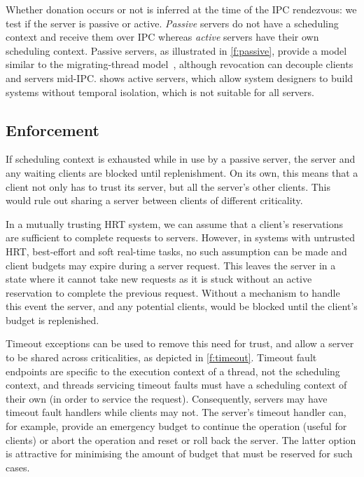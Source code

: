 Whether donation occurs or not is inferred at the time of the \gls{IPC} rendezvous: we test if the
server is passive or active. 
\emph{Passive} servers do not have a scheduling context 
and receive them over \gls{IPC} whereas \emph{active} servers have their own scheduling context. 
Passive servers, as illustrated in \cref{f:passive}, provide a model similar to the 
 migrating-thread model~\citep{Ford_Lepreau_94, Gabber_SBBS_99}, although revocation can decouple
 clients and servers mid-IPC.  shows active servers, which allow system designers to
build systems without temporal isolation, which is not suitable
for all servers.

\subsection{Enforcement}

If scheduling context is exhausted while in use by a passive server, the server and any waiting clients
are blocked until replenishment. On its own, this means that a client
not only has to trust its server, but all the server's other
clients. This would rule out sharing a server between clients of
different criticality.

In a mutually trusting \gls{HRT} system, we can assume that a client's reservations are sufficient to complete
requests to servers.  However, in systems with untrusted \gls{HRT}, best-effort and soft real-time tasks, no such
assumption can be made and client budgets may expire during a server request.  This leaves the
server in a state where it cannot take new requests as it is stuck without an active reservation to
complete the previous request.  Without a mechanism to handle this event the server, and any
potential clients, would be blocked until the client's budget is replenished.

Timeout exceptions can be used to remove this need for trust, and
allow a server to be shared across criticalities, as depicted in \cref{f:timeout}. Timeout fault endpoints are specific to the
execution context of a thread, not the scheduling context, and threads servicing timeout faults must
have a scheduling context of their own (in order to service the request). Consequently, servers may have timeout
fault handlers while clients may not. The 
server's timeout handler can, for example, provide an emergency budget
to continue the operation (useful for  clients) or abort
the operation and reset or roll back the server. The latter option is
attractive for minimising the amount of budget that must be reserved
for such cases.

